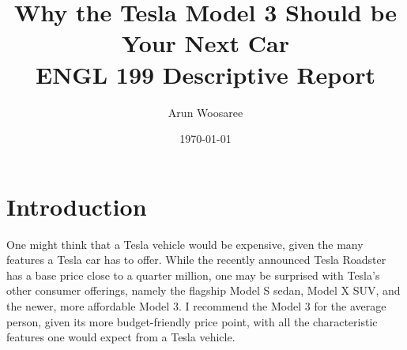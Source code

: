 \documentclass{article}
\title{Why the Tesla Model 3 Should be Your Next Car\\
\vspace{.25cm}\large ENGL 199 Descriptive Report \vspace{-.5cm}}
\author{\LARGE Arun Woosaree}
\date{\today}
\begin{document}
  \maketitle %

  \section{Introduction}
  One might think that a Tesla vehicle would be expensive, given the many
  features a Tesla car has to offer. While the recently announced Tesla Roadster
  has a base price close to a quarter million\cite{teslaroadster}, one may be
  surprised with Tesla's other consumer offerings, namely the flagship Model S sedan, Model X SUV,
  and the newer, more affordable Model 3. I recommend the Model 3 for the average person,
  given its more budget-friendly price point, with all the characteristic features
  one would expect from a Tesla vehicle.
  \newpage
\end{document}
